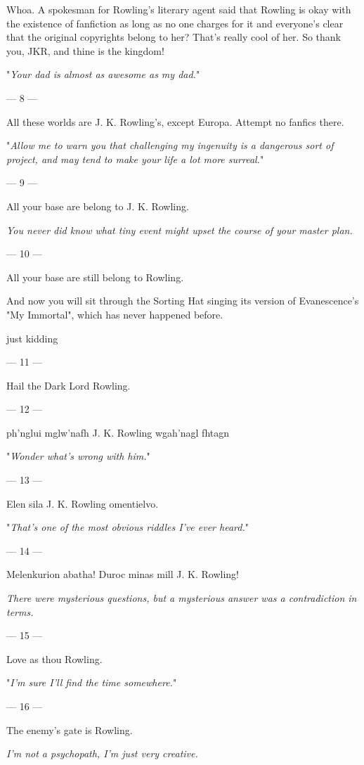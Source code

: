 {Whoa. A spokesman
for Rowling's literary agent said that Rowling is okay with the existence of
fanfiction as long as no one charges for it and everyone's clear that the
original copyrights belong to her? That's really cool of her. So thank you,
JKR, and thine is the kingdom!

"\emph{Your dad is almost as awesome as my dad.}"

--- 8 ---

All these worlds
are J. K. Rowling's, except Europa. Attempt no fanfics there.

"\emph{Allow me to warn you that challenging my ingenuity is a dangerous sort
of project, and may tend to make your life a lot more surreal.}"

--- 9 ---

All your base are
belong to J. K. Rowling.

\emph{You never did know what tiny event might upset the course of your master
plan.}

--- 10 ---

All your base are
still belong to Rowling.

And now you will sit through the Sorting Hat singing its version of
Evanescence's "My Immortal", which has never happened before.

just kidding

--- 11 ---

Hail the Dark Lord Rowling.

--- 12 ---

ph'nglui mglw'nafh J. K. Rowling wgah'nagl fhtagn

"\emph{Wonder what's wrong with \emph{him}.}"

--- 13 ---

Elen sila J. K. Rowling omentielvo.

"\emph{That's one of the most obvious riddles I've ever heard.}"

--- 14 ---

Melenkurion abatha! Duroc minas mill J. K. Rowling!

\emph{There were mysterious questions, but a mysterious answer was a
contradiction in terms.}

--- 15 ---

Love as thou Rowling.

"\emph{I'm sure I'll find the time somewhere.}"

--- 16 ---

The enemy's gate is Rowling.

\emph{I'm not a psychopath, I'm just very creative.}

}
